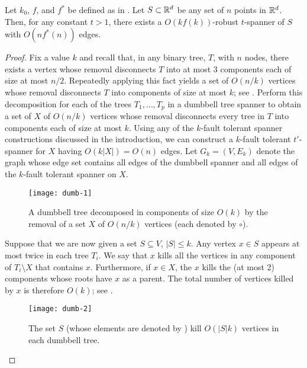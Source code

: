 \documentclass{patmorin}
\begin{document}
\begin{thm}
  Let $k_0$, $f$, and $f^*$ be defined as in .
  Let $S\subset \mathbb{R}^d$ be any set of $n$ points in $\mathbb{R}^d$.  Then, for any
  constant $t>1$,  there exists a $O(kf(k))$-robust $t$-spanner of $S$
  with $O(nf^*(n))$ edges.
\end{thm}

\begin{proof} 
  Fix a value $k$ and recall that, in any binary tree, $T$, with $n$
  nodes, there exists a vertex whose removal disconnects $T$ into at
  most 3 components each of size at most $n/2$.  Repeatedly applying
  this fact yields a set of $O(n/k)$ vertices whose removal disconnects
  $T$ into components of size at most $k$; see .
  Perform this decomposition for each of the trees $T_1,\ldots,T_p$ in a
  dumbbell tree spanner to obtain a set of $X$ of $O(n/k)$ vertices whose
  removal disconnects every tree in $T$ into components each of size at
  most $k$.  Using any of the $k$-fault tolerant spanner constructions
  discussed in the introduction, we can construct a $k$-fault tolerant
  $t'$-spanner for $X$ having $O(k|X|)=O(n)$ edges.  Let $G_k=(V,E_k)$
  denote the graph whose edge set contains all edges of the dumbbell
  spanner and all edges of the $k$-fault tolerant spanner on $X$.
  
  \begin{figure}
    \begin{center}
      \texttt{[image: dumb-1]}
    \end{center}
    \caption{A dumbbell tree decomposed in components of size $O(k)$
    by the removal of a set $X$ of $O(n/k)$ vertices (each denoted
    by $\circ$).}
  \end{figure}
  
  Suppose that we are now given a set $S\subseteq V$, $|S|\le k$.
  Any vertex $x\in S$ appears at most twice in each tree $T_i$.  We say
  that $x$ kills all the vertices in any component of $T_i\setminus X$
  that contains $x$.  Furthermore, if $x\in X$, the $x$ kills the (at most
  2) components whose roots have $x$ as a parent.  The total number of
  vertices killed by $x$ is therefore $O(k)$; see .

  \begin{figure}
    \begin{center}
      \texttt{[image: dumb-2]}
    \end{center}
    \caption{The set $S$ (whose elements are denoted by \textbullet) kill
      $O(|S|k)$ vertices in each dumbbell tree.}
  \end{figure}
  

\end{proof}
\end{document}
